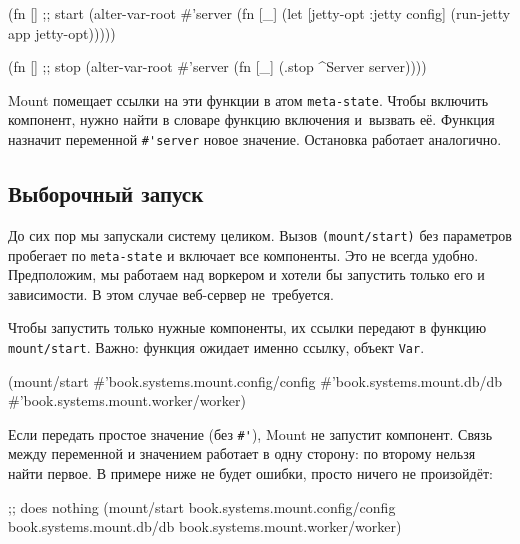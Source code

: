 \begin{english}
  \begin{clojure}
(fn [] ;; start
  (alter-var-root #'server
   (fn [_]
     (let [{jetty-opt :jetty} config]
       (run-jetty app jetty-opt)))))

(fn [] ;; stop
  (alter-var-root #'server
   (fn [_]
     (.stop ^Server server))))
  \end{clojure}
\end{english}

Mount помещает ссылки на эти функции в атом \verb|meta-state|. Чтобы включить
компонент, нужно найти в словаре функцию включения и~вызвать её. Функция
назначит переменной \verb|#'server| новое значение. Остановка работает
аналогично.

\subsection{Выборочный запуск}

\label{mount-selective}

До сих пор мы запускали систему целиком. Вызов \verb|(mount/start)| без
параметров пробегает по \verb|meta-state| и включает все компоненты. Это не
всегда удобно. Предположим, мы работаем над воркером и хотели бы запустить
только его и зависимости. В этом случае веб-сервер не~требуется.

Чтобы запустить только нужные компоненты, их ссылки передают в функцию
\verb|mount/start|. Важно: функция ожидает именно ссылку, объект \verb|Var|.

\begin{english}
  \begin{clojure}
(mount/start
  #'book.systems.mount.config/config
  #'book.systems.mount.db/db
  #'book.systems.mount.worker/worker)
  \end{clojure}
\end{english}

Если передать простое значение (без \verb|#'|), Mount не запустит
компонент. Связь между переменной и значением работает в одну сторону: по
второму нельзя найти первое. В примере ниже не будет ошибки, просто ничего не
произойдёт:

\pagebreakafive

\begin{english}
  \begin{clojure}
;; does nothing
(mount/start
  book.systems.mount.config/config
  book.systems.mount.db/db
  book.systems.mount.worker/worker)
  \end{clojure}
\end{english}

